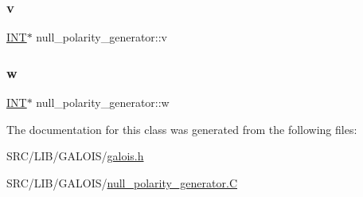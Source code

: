 \mbox{\label{classnull__polarity__generator_ab8eea1e6671ebd7ecdc7efaf08544cb3}} 
\subsubsection{\texorpdfstring{v}{v}}
{\footnotesize\ttfamily \mbox{\hyperlink{galois_8h_a09fddde158a3a20bd2dcadb609de11dc}{I\+NT}}$\ast$ null\+\_\+polarity\+\_\+generator\+::v}

\mbox{\label{classnull__polarity__generator_a72e141167b0ebc9f123489b9c2934970}} 
\subsubsection{\texorpdfstring{w}{w}}
{\footnotesize\ttfamily \mbox{\hyperlink{galois_8h_a09fddde158a3a20bd2dcadb609de11dc}{I\+NT}}$\ast$ null\+\_\+polarity\+\_\+generator\+::w}



The documentation for this class was generated from the following files\+:\begin{DoxyCompactItemize}
\item 
S\+R\+C/\+L\+I\+B/\+G\+A\+L\+O\+I\+S/\mbox{\hyperlink{galois_8h}{galois.\+h}}\item 
S\+R\+C/\+L\+I\+B/\+G\+A\+L\+O\+I\+S/\mbox{\hyperlink{null__polarity__generator_8_c}{null\+\_\+polarity\+\_\+generator.\+C}}\end{DoxyCompactItemize}
